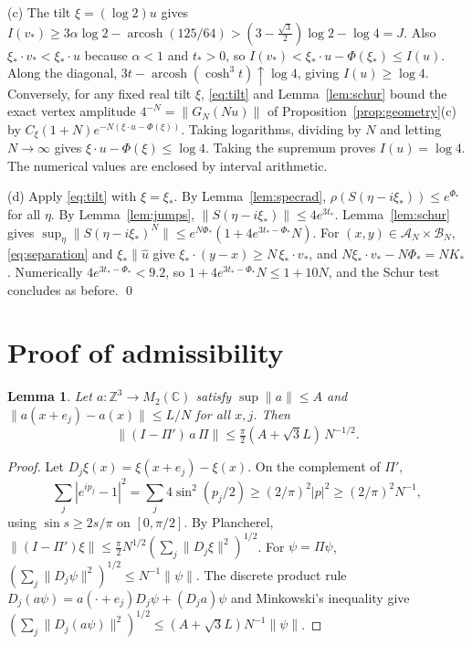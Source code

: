 \documentclass[11pt]{amsart}
\newtheorem{lemma}[theorem]{Lemma}
\theoremstyle{definition}
\theoremstyle{remark}
\newcommand{\Z}{\mathbb{Z}}
\newcommand{\C}{\mathbb{C}}
\newcommand{\cA}{\mathcal{A}}
\newcommand{\cB}{\mathcal{B}}
\newcommand{\arcosh}{\operatorname{arcosh}}
\newcommand{\uhat}{\hat u}
\begin{document}
(c) The tilt $\xi=(\log2)u$ gives
$I(v_*)\ge3\alpha\log2-\arcosh(125/64)>(3-\tfrac{\sqrt3}2)\log2-\log4=J$.
Also $\xi_*\cdot v_*<\xi_*\cdot u$ because $\alpha<1$ and $t_*>0$, so
$I(v_*)<\xi_*\cdot u-\Phi(\xi_*)\le I(u)$.  Along the diagonal,
$3t-\arcosh(\cosh^3t)\uparrow\log4$, giving $I(u)\ge\log4$.
Conversely, for any fixed real tilt $\xi$, \eqref{eq:tilt} and
Lemma~\ref{lem:schur} bound the exact vertex amplitude
$4^{-N}=\|G_N(Nu)\|$ of Proposition~\ref{prop:geometry}(c) by
$C_\xi(1+N)e^{-N(\xi\cdot u-\Phi(\xi))}$.
Taking logarithms, dividing by $N$ and letting $N\to\infty$ gives
$\xi\cdot u-\Phi(\xi)\le\log4$. Taking the supremum proves
$I(u)=\log4$. The numerical values are
enclosed by interval arithmetic.

(d) Apply \eqref{eq:tilt} with $\xi=\xi_*$.  By Lemma~\ref{lem:specrad},
$\rho(S(\eta-i\xi_*))\le e^{\Phi_*}$ for all $\eta$.  By
Lemma~\ref{lem:jumps}, $\|S(\eta-i\xi_*)\|\le4e^{3t_*}$.
Lemma~\ref{lem:schur} gives
$\sup_\eta\|S(\eta-i\xi_*)^N\|\le e^{N\Phi_*}(1+4e^{3t_*-\Phi_*}N)$.  For
$(x,y)\in\cA_N\times\cB_N$, \eqref{eq:separation} and $\xi_*\parallel\uhat$
give $\xi_*\cdot(y-x)\ge N\,\xi_*\cdot v_*$, and
$N\xi_*\cdot v_*-N\Phi_*=NK_*$.  Numerically $4e^{3t_*-\Phi_*}<9.2$, so
$1+4e^{3t_*-\Phi_*}N\le1+10N$, and the Schur test concludes as before.
\qed

\section{Proof of admissibility}\label{sec:admissible}

\begin{lemma}\label{lem:IR1}
Let $a:\Z^3\to M_2(\C)$ satisfy $\sup\|a\|\le A$ and
$\|a(x+e_j)-a(x)\|\le L/N$ for all $x,j$.  Then
\[
\|(I-\Pi')\,a\,\Pi\|\le\tfrac\pi2(A+\sqrt3L)\,N^{-1/2}.
\]
\end{lemma}

\begin{proof}
Let $D_j\xi(x)=\xi(x+e_j)-\xi(x)$.  On the complement of $\Pi'$,
\[
\sum_j|e^{ip_j}-1|^2=\sum_j4\sin^2(p_j/2)\ge(2/\pi)^2|p|^2\ge(2/\pi)^2N^{-1},
\]
using $\sin s\ge2s/\pi$ on $[0,\pi/2]$.  By Plancherel,
$\|(I-\Pi')\xi\|\le\frac\pi2N^{1/2}(\sum_j\|D_j\xi\|^2)^{1/2}$.  For
$\psi=\Pi\psi$, $(\sum_j\|D_j\psi\|^2)^{1/2}\le N^{-1}\|\psi\|$.  The
discrete product rule
$D_j(a\psi)=a(\cdot+e_j)D_j\psi+(D_ja)\psi$ and Minkowski's inequality give
$(\sum_j\|D_j(a\psi)\|^2)^{1/2}\le(A+\sqrt3L)N^{-1}\|\psi\|$.
\end{proof}
\end{document}
